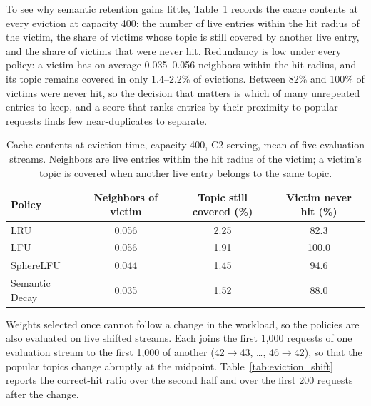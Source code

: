 \documentclass[authoryear,preprint,review,12pt]{elsarticle}
\begin{document}
To see why semantic retention gains little, Table~\ref{tab:eviction_density} records the cache contents at every eviction at capacity 400: the number of live entries within the hit radius of the victim, the share of victims whose topic is still covered by another live entry, and the share of victims that were never hit. Redundancy is low under every policy: a victim has on average 0.035--0.056 neighbors within the hit radius, and its topic remains covered in only 1.4--2.2\% of evictions. Between 82\% and 100\% of victims were never hit, so the decision that matters is which of many unrepeated entries to keep, and a score that ranks entries by their proximity to popular requests finds few near-duplicates to separate.

\begin{table}[htbp]
\centering
\caption{Cache contents at eviction time, capacity 400, C2 serving, mean of five evaluation streams. Neighbors are live entries within the hit radius of the victim; a victim's topic is covered when another live entry belongs to the same topic.}
\label{tab:eviction_density}
\footnotesize
\begin{tabular}{lccc}
\toprule
Policy & Neighbors of victim & Topic still covered (\%) & Victim never hit (\%) \\
\midrule
LRU & 0.056 & 2.25 & 82.3 \\
LFU & 0.056 & 1.91 & 100.0 \\
SphereLFU & 0.044 & 1.45 & 94.6 \\
Semantic Decay & 0.035 & 1.52 & 88.0 \\
\bottomrule
\end{tabular}
\end{table}

Weights selected once cannot follow a change in the workload, so the policies are also evaluated on five shifted streams. Each joins the first 1,000 requests of one evaluation stream to the first 1,000 of another (42$\rightarrow$43, \ldots, 46$\rightarrow$42), so that the popular topics change abruptly at the midpoint. Table~\ref{tab:eviction_shift} reports the correct-hit ratio over the second half and over the first 200 requests after the change.
\end{document}
